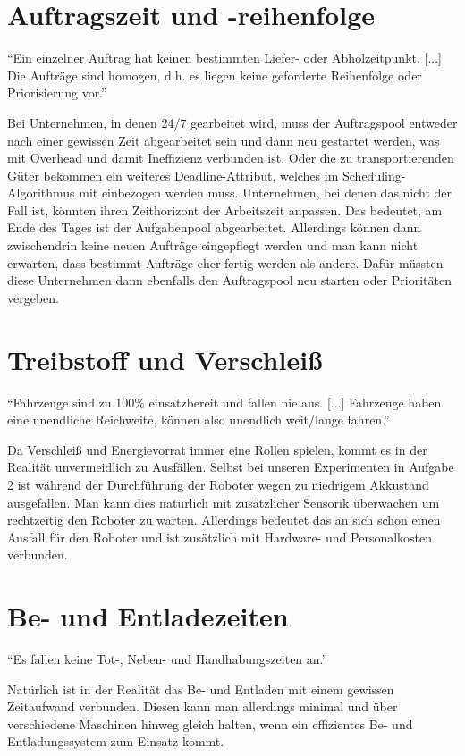 \documentclass[ngerman]{tudscrreprt}
\begin{document}
\section{Auftragszeit und -reihenfolge}
\begin{displayquote}
    ``Ein einzelner Auftrag hat keinen bestimmten Liefer- oder Abholzeitpunkt. [...] Die
    Aufträge sind homogen, d.h. es liegen keine geforderte Reihenfolge oder Priorisierung
    vor.'' \cite{aufgabenstellung}
\end{displayquote}
%
Bei Unternehmen, in denen 24/7 gearbeitet wird, muss der Auftragspool entweder nach einer
gewissen Zeit abgearbeitet sein und dann neu gestartet werden, was mit Overhead und damit
Ineffizienz verbunden ist. Oder die zu transportierenden Güter bekommen ein weiteres
Deadline-Attribut, welches im Scheduling-Algorithmus mit einbezogen werden muss.
Unternehmen, bei denen das nicht der Fall ist, könnten ihren Zeithorizont der Arbeitszeit
anpassen. Das bedeutet, am Ende des Tages ist der Aufgabenpool abgearbeitet. Allerdings
können dann zwischendrin keine neuen Aufträge eingepflegt werden und man kann nicht
erwarten, dass bestimmt Aufträge eher fertig werden als andere. Dafür müssten diese
Unternehmen dann ebenfalls den Auftragspool neu starten oder Prioritäten vergeben.

\section{Treibstoff und Verschleiß}
\begin{displayquote}
    ``Fahrzeuge sind zu 100\% einsatzbereit und fallen nie aus. [...] Fahrzeuge haben eine
    unendliche Reichweite, können also unendlich weit/lange fahren.''
    \cite{aufgabenstellung}
\end{displayquote}
%
Da Verschleiß und Energievorrat immer eine Rollen spielen, kommt es in der Realität
unvermeidlich zu Ausfällen. Selbst bei unseren Experimenten in Aufgabe 2 ist während der
Durchführung der Roboter wegen zu niedrigem Akkustand ausgefallen. Man kann dies natürlich
mit zusätzlicher Sensorik überwachen um rechtzeitig den Roboter zu warten. Allerdings
bedeutet das an sich schon einen Ausfall für den Roboter und ist zusätzlich mit Hardware-
und Personalkosten verbunden.

\section{Be- und Entladezeiten}
\begin{displayquote}
    ``Es fallen keine Tot-, Neben- und Handhabungszeiten an.''
    \cite{aufgabenstellung}
\end{displayquote}
%
Natürlich ist in der Realität das Be- und Entladen mit einem gewissen Zeitaufwand
verbunden. Diesen kann man allerdings minimal und über verschiedene Maschinen hinweg
gleich halten, wenn ein effizientes Be- und Entladungssystem zum Einsatz kommt.
\end{document}
